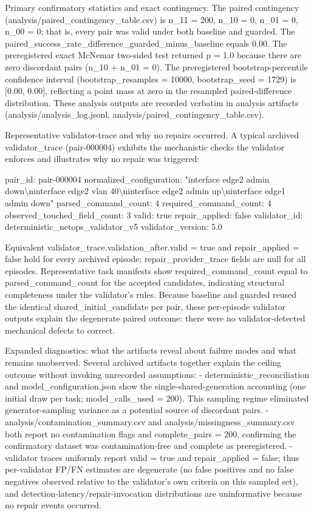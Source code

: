 \documentclass[conference]{IEEEtran}
\begin{document}
Primary confirmatory statistics and exact contingency. The paired contingency (analysis/paired\_contingency\_table.csv) is n\_11 = 200, n\_10 = 0, n\_01 = 0, n\_00 = 0; that is, every pair was valid under both baseline and guarded. The paired\_success\_rate\_difference\_guarded\_minus\_baseline equals 0.00. The preregistered exact McNemar two-sided test returned p = 1.0 because there are zero discordant pairs (n\_10 + n\_01 = 0). The preregistered bootstrap-percentile confidence interval (bootstrap\_resamples = 10000, bootstrap\_seed = 1729) is [0.00, 0.00], reflecting a point mass at zero in the resampled paired-difference distribution. These analysis outputs are recorded verbatim in analysis artifacts (analysis/analysis\_log.jsonl, analysis/paired\_contingency\_table.csv).

Representative validator-trace and why no repairs occurred. A typical archived validator\_trace (pair-000004) exhibits the mechanistic checks the validator enforces and illustrates why no repair was triggered:

pair\_id: pair-000004
  normalized\_configuration: "interface edge2 admin down\textbackslash{}ninterface edge2 vlan 40\textbackslash{}ninterface edge2 admin up\textbackslash{}ninterface edge1 admin down"
  parsed\_command\_count: 4
  required\_command\_count: 4
  observed\_touched\_field\_count: 3
  valid: true
  repair\_applied: false
  validator\_id: deterministic\_netops\_validator\_v5
  validator\_version: 5.0

Equivalent validator\_trace.validation\_after.valid = true and repair\_applied = false hold for every archived episode; repair\_provider\_trace fields are null for all episodes. Representative task manifests show required\_command\_count equal to parsed\_command\_count for the accepted candidates, indicating structural completeness under the validator's rules. Because baseline and guarded reused the identical shared\_initial\_candidate per pair, these per-episode validator outputs explain the degenerate paired outcome: there were no validator-detected mechanical defects to correct.

Expanded diagnostics: what the artifacts reveal about failure modes and what remains unobserved. Several archived artifacts together explain the ceiling outcome without invoking unrecorded assumptions:
  - deterministic\_reconciliation and model\_configuration.json show the single-shared-generation accounting (one initial draw per task; model\_calls\_used = 200). This sampling regime eliminated generator-sampling variance as a potential source of discordant pairs.
  - analysis/contamination\_summary.csv and analysis/missingness\_summary.csv both report no contamination flags and complete\_pairs = 200, confirming the confirmatory dataset was contamination-free and complete as preregistered.
  - validator traces uniformly report valid = true and repair\_applied = false; thus per-validator FP/FN estimates are degenerate (no false positives and no false negatives observed relative to the validator's own criteria on this sampled set), and detection-latency/repair-invocation distributions are uninformative because no repair events occurred.
\end{document}

